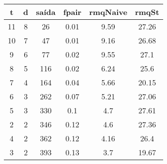 \begin{tabular}{|c|c|c|c|c|c|}
\hline
\textbf{t} & \textbf{d} & \textbf{saída} & \textbf{fpair} & \textbf{rmqNaive} & \textbf{rmqSt}\\
\hline
11 & 8 & 26 & 0.01 & 9.59 & 27.26\\
\hline
10 & 7 & 47 & 0.01 & 9.16 & 26.68\\
\hline
9 & 6 & 77 & 0.02 & 9.55 & 27.1\\
\hline
8 & 5 & 116 & 0.02 & 6.24 & 25.6\\
\hline
7 & 4 & 164 & 0.04 & 5.66 & 20.15\\
\hline
6 & 3 & 262 & 0.07 & 5.21 & 27.06\\
\hline
5 & 3 & 330 & 0.1 & 4.7 & 27.61\\
\hline
2 & 2 & 346 & 0.12 & 4.6 & 27.36\\
\hline
4 & 2 & 362 & 0.12 & 4.16 & 26.4\\
\hline
3 & 2 & 393 & 0.13 & 3.7 & 19.67\\
\hline
\end{tabular}

